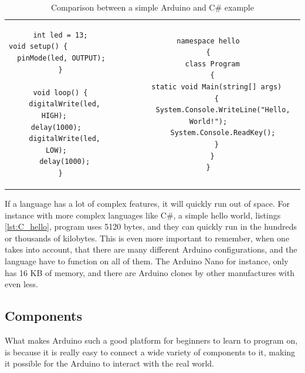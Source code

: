 \begin{table}[h!]\scriptsize
\centering
\begin{tabular}{cc} 
\begin{minipage}{6cm}
{\begin{lstlisting}[caption=Arduino,frame=none,resetmargins=true,label={lst:blink}]
int led = 13;
void setup() {                
  pinMode(led, OUTPUT);     
}

void loop() {
  digitalWrite(led, HIGH);   
  delay(1000);    
  digitalWrite(led, LOW);  
  delay(1000);
}
\end{lstlisting}}
\end{minipage}
  & 
\begin{minipage}{10cm}
{\begin{lstlisting}[caption=C\#,frame=none,resetmargins=true,label={lst:C_hello}]
namespace hello
{
  class Program
  {
    static void Main(string[] args)
    {
       System.Console.WriteLine("Hello, World!");
       System.Console.ReadKey();
    }
  }
}
\end{lstlisting}}
  \end{minipage}
 \\ 
 \end{tabular} 
 \caption{Comparison between a simple Arduino and C\# example}
 \end{table} 

If a language has a lot of complex features, it will quickly run out of space. For instance with more complex languages like C\#, a simple hello world, listings \ref{lst:C_hello}, program uses 5120 bytes, and they can quickly run in the hundreds or thousands of kilobytes. This is even more important to remember, when one takes into account, that there are many different Arduino configurations, and the language have to function on all of them. The Arduino Nano for instance, only has 16 KB of memory, and there are Arduino clones by other manufactures with even less.



\subsection*{Components}
What makes Arduino such a good platform for beginners to learn to program on, is because it is really easy to connect a wide variety of components to it, making it possible for the Arduino to interact with the real world.

